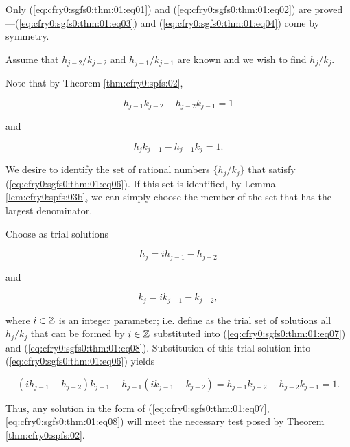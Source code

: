 \begin{vworktheoremproof}
Only (\ref{eq:cfry0:sgfs0:thm:01:eq01}) and
(\ref{eq:cfry0:sgfs0:thm:01:eq02}) are 
proved---(\ref{eq:cfry0:sgfs0:thm:01:eq03}) and
(\ref{eq:cfry0:sgfs0:thm:01:eq04}) come by symmetry.

Assume that $h_{j-2}/k_{j-2}$ and $h_{j-1}/k_{j-1}$ are known and we wish
to find $h_{j}/k_{j}$.

Note that by Theorem \ref{thm:cfry0:spfs:02},

\begin{equation}
\label{eq:cfry0:sgfs0:thm:01:eq05}
h_{j-1} k_{j-2} - h_{j-2} k_{j-1} = 1
\end{equation}

and

\begin{equation}
\label{eq:cfry0:sgfs0:thm:01:eq06}
h_{j} k_{j-1} - h_{j-1} k_{j} = 1 .
\end{equation}

We desire to identify the set of rational numbers $\{ h_j / k_j \}$ that satisfy 
(\ref{eq:cfry0:sgfs0:thm:01:eq06}).  If this set is identified, by Lemma
\ref{lem:cfry0:spfs:03b}, we can simply choose the member of the set that has the
largest denominator.

Choose as trial solutions

\begin{equation}
\label{eq:cfry0:sgfs0:thm:01:eq07}
h_j = i h_{j-1} - h_{j-2}
\end{equation}

and 

\begin{equation}
\label{eq:cfry0:sgfs0:thm:01:eq08}
k_j = i k_{j-1} - k_{j-2} ,
\end{equation}

where $i \in {\mathbb{Z}}$ is an integer parameter; i.e. define
as the trial set of solutions all $h_j /k_j$ that can be formed
by $i \in {\mathbb{Z}}$ substituted into 
(\ref{eq:cfry0:sgfs0:thm:01:eq07}) and 
(\ref{eq:cfry0:sgfs0:thm:01:eq08}).  Substitution of this trial
solution into (\ref{eq:cfry0:sgfs0:thm:01:eq06}) yields

\begin{equation}
\label{eq:cfry0:sgfs0:thm:01:eq09}
(i h_{j-1} - h_{j-2}) k_{j-1} - h_{j-1} (i k_{j-1} - k_{j-2} )
= h_{j-1} k_{j-2} - h_{j-2} k_{j-1} = 1.
\end{equation}

Thus, any solution in the form of 
(\ref{eq:cfry0:sgfs0:thm:01:eq07}, \ref{eq:cfry0:sgfs0:thm:01:eq08})
will meet the necessary test posed
by Theorem \ref{thm:cfry0:spfs:02}.


\end{vworktheoremproof}
